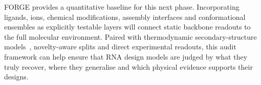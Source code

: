 FORGE provides a quantitative baseline for this next phase. Incorporating ligands, ions, chemical modifications, assembly interfaces and conformational ensembles as explicitly testable layers will connect static backbone readouts to the full molecular environment. Paired with thermodynamic secondary-structure models~\citep{lorenz2011viennarna}, novelty-aware splits and direct experimental readouts, this audit framework can help ensure that RNA design models are judged by what they truly recover, where they generalise and which physical evidence supports their designs.
